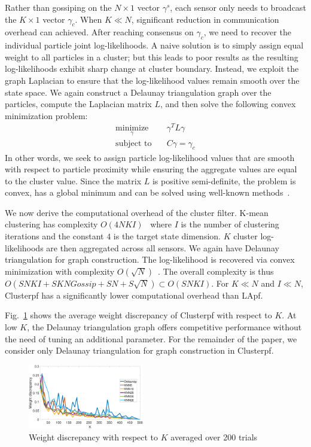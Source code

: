 \documentclass[10pt,letterpaper,final]{article}
\begin{document}
Rather than gossiping on the $N\times 1$ vector $\gamma^s$, each sensor only needs to broadcast the $K\times 1$ vector $\gamma_c$. When $K \ll N$, significant reduction in communication overhead can achieved. After reaching consensus on $\gamma_c$, we need to recover the individual particle joint log-likelihoods. A naive solution is to simply assign equal weight to all particles in a cluster; but this leads to poor results as the resulting log-likelihoods exhibit sharp change at cluster boundary. Instead, we exploit the graph Laplacian to ensure that the log-likelihood values remain smooth over the state space. We again construct a Delaunay triangulation graph over the particles, compute the Laplacian matrix $L$, and then solve the following convex minimization problem:
\begin{align}
\underset{\gamma}{\text{minimize}}& \quad \gamma^TL\gamma  \\
\text{subject to}& \quad C\gamma = \gamma_c
\end{align}
In other words, we seek to assign particle log-likelihood values that are smooth with respect to particle proximity while ensuring the aggregate values are equal to the cluster value. Since the matrix $L$ is positive semi-definite, the problem is convex, has a global minimum and can be solved using well-known methods~\cite{Boyd2004}.

We now derive the computational overhead of the cluster filter. K-mean clustering has complexity $O(4NKI)$~\cite{Hartigan1979} where $I$ is the number of clustering iterations and the constant $4$ is the target state dimension. $K$ cluster log-likelihoods are then aggregated across all sensors. We again have Delaunay triangulation for graph construction. The log-likelihood is recovered via convex minimization with complexity $O(\sqrt{N})$~\cite{Potra2000}. The overall complexity is thus $O(SNKI+SKNGossip + SN+S\sqrt{N})\subset O(SNKI)$. For $K\ll N$ and $I \ll N$, Clusterpf has a significantly lower computational overhead than LApf. 

Fig.~\ref{fig:Clusterpf_single_time} shows the average weight discrepancy of Clusterpf with respect to $K$. At low $K$, the Delaunay triangulation graph offers competitive performance without the need of tuning an additional parameter. For the remainder of the paper, we consider only Delaunay triangulation for graph construction in Clusterpf. 

\begin{figure}
\centering
\includegraphics[width=0.45\textwidth]{Figures/Clusterpf_single_time}
\caption{Weight discrepancy with respect to $K$ averaged over 200 trials}
\label{fig:Clusterpf_single_time}
\end{figure}
\end{document}
